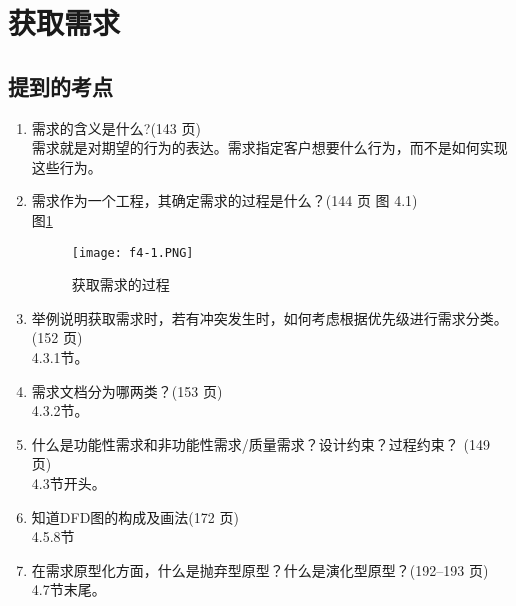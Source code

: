 \documentclass[14pt, letterpaper, UTF8, fontset=windowsnew, heading=true]{article}
\begin{document}
\section{获取需求}

\subsection{提到的考点}

\begin{enumerate}
	\item 需求的含义是什么?(143 页) \\
	需求就是对期望的行为的表达。需求指定客户想要什么行为，而不是如何实现这些行为。
	
	\item 需求作为一个工程，其确定需求的过程是什么？(144 页 图 4.1) \\图\ref{fig:collectrequirements}
	\begin{figure}[h]
		\centering
		\texttt{[image: f4-1.PNG]}
		\caption{获取需求的过程}
		\label{fig:collectrequirements}
	\end{figure}

	\item 举例说明获取需求时，若有冲突发生时，如何考虑根据优先级进行需求分类。(152 页) \\ 4.3.1节。
	

	\item 需求文档分为哪两类？(153 页) \\ 4.3.2节。
	
	\item 什么是功能性需求和非功能性需求/质量需求？设计约束？过程约束？ (149 页)
	\\ 4.3节开头。
	

	\item 知道DFD图的构成及画法(172 页) \\ 4.5.8节
	
	\item 在需求原型化方面，什么是抛弃型原型？什么是演化型原型？(192--193 页) \\
	4.7节末尾。
	

\end{enumerate}
\end{document}
